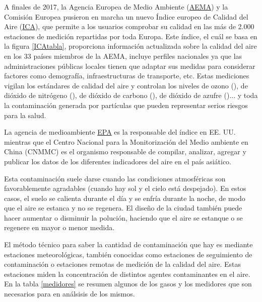    A finales de 2017, la Agencia Europea de Medio Ambiente (\href{https://www.eea.europa.eu/}{AEMA}) y la Comisión Europea pusieron en marcha un nuevo Índice europeo de Calidad del Aire (\href{https://www.eltiempo.es/calidad-aire}{ICA}), que permite a los usuarios comprobar su calidad en las más de 2.000 estaciones de medición repartidas por toda Europa. Este índice, el cuál se basa en la figura \ref{ICAtabla}, proporciona información actualizada sobre la calidad del aire en los 33 países miembros de la AEMA, incluye perfiles nacionales ya que las administraciones públicas locales tienen que adaptar sus medidas para considerar factores como demografía, infraestructuras de transporte, etc. Estas mediciones vigilan los estándares de calidad del aire y controlan los niveles de ozono (), de dióxido de nitrógeno (), de dióxido de carbono (), de dióxido de azufre ()... y toda la contaminación generada por partículas que pueden representar serios riesgos para la salud.
      
  La agencia de medioambiente \href{https://www.epa.gov}{EPA} es la responsable del índice en EE. UU. mientras que el Centro Nacional para la Monitorización del Medio ambiente en China (CNMMC) es el organismo responsable de compilar, analizar, agregar y publicar los datos de los diferentes indicadores del aire en el país asiático.
  
   
   Esta contaminación suele darse  cuando las condiciones atmosféricas son favorablemente agradables (cuando hay sol y el cielo está despejado). En estos casos, el suelo se calienta durante el día y se enfría durante la noche, de modo que el aire se estanca y no se regenera. El diseño de la ciudad también puede hacer aumentar o disminuir la polución, haciendo que el aire se estanque o se regenere en mayor o menor medida.
   
   El método técnico para saber la cantidad de contaminación que hay es mediante estaciones meteorológicas, también conocidas como estaciones de seguimiento de contaminación o estaciones remotas de medición de la calidad del aire. Estas estaciones miden la concentración de distintos agentes contaminantes en el aire. En la tabla \ref{medidores} se resumen algunos de los gasos y los medidores que son necesarios para en análsisis de los mismos.
      
